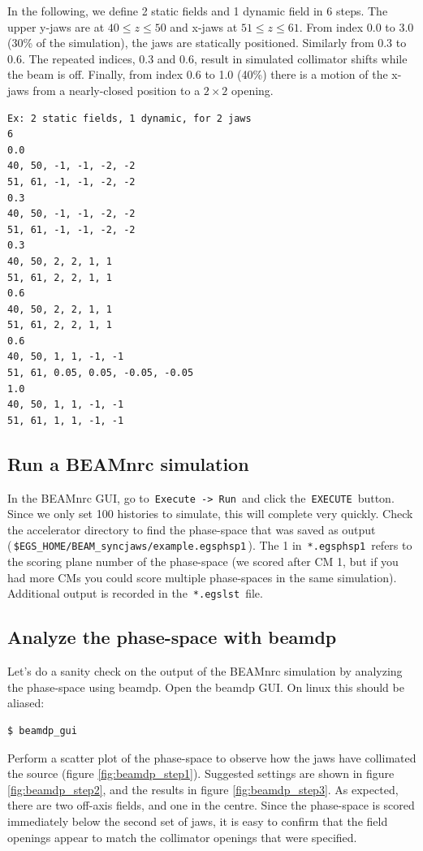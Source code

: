 \documentclass[12pt,twoside]{article}
\begin{document}
In the following, we define 2 static fields and 1 dynamic field in 6 steps. The upper y-jaws are at $40 \le z \le 50$ and x-jaws at $51 \le z \le 61$. From index 0.0 to 3.0 (30\% of the simulation), the jaws are statically positioned. Similarly from 0.3 to 0.6. The repeated indices, 0.3 and 0.6, result in simulated collimator shifts while the beam is off. Finally, from index 0.6 to 1.0 (40\%) there is a motion of the x-jaws from a nearly-closed position to a $2 \times 2$ opening.

{\scriptsize
\begin{lstlisting}[language={},backgroundcolor=\color{white}]
Ex: 2 static fields, 1 dynamic, for 2 jaws
6
0.0
40, 50, -1, -1, -2, -2
51, 61, -1, -1, -2, -2
0.3
40, 50, -1, -1, -2, -2
51, 61, -1, -1, -2, -2
0.3
40, 50, 2, 2, 1, 1
51, 61, 2, 2, 1, 1
0.6
40, 50, 2, 2, 1, 1
51, 61, 2, 2, 1, 1
0.6
40, 50, 1, 1, -1, -1
51, 61, 0.05, 0.05, -0.05, -0.05
1.0
40, 50, 1, 1, -1, -1
51, 61, 1, 1, -1, -1
\end{lstlisting}
}

\subsection{Run a BEAMnrc simulation}
In the BEAMnrc GUI, go to \,\Verb|Execute -> Run|\, and click the \,\Verb|EXECUTE|\, button. Since we only set 100 histories to simulate, this will complete very quickly. Check the accelerator directory to find the phase-space that was saved as output \\
(\,\Verb|$EGS_HOME/BEAM_syncjaws/example.egsphsp1|\,). The 1 in \,\Verb|*.egsphsp1|\, refers to the scoring plane number of the phase-space (we scored after CM 1, but if you had more CMs you could score multiple phase-spaces in the same simulation). Additional output is recorded in the \,\Verb|*.egslst|\, file.

\clearpage
\subsection{Analyze the phase-space with beamdp}
Let's do a sanity check on the output of the BEAMnrc simulation by analyzing the phase-space using beamdp. Open the beamdp GUI. On linux this should be aliased:

\begin{lstlisting}
$ beamdp_gui
\end{lstlisting}

Perform a scatter plot of the phase-space to observe how the jaws have collimated the source (figure \ref{fig:beamdp_step1}). Suggested settings are shown in figure \ref{fig:beamdp_step2}, and the results in figure \ref{fig:beamdp_step3}. As expected, there are two off-axis fields, and one in the centre. Since the phase-space is scored immediately below the second set of jaws, it is easy to confirm that the field openings appear to match the collimator openings that were specified.
\end{document}
